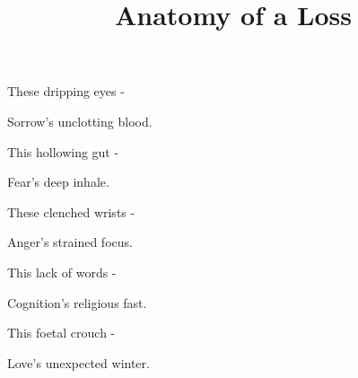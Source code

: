 \documentclass{article}
\title{Anatomy of a Loss}
\begin{document}
 \newline

These dripping eyes - \newline

Sorrow's unclotting blood.\newline

This hollowing gut - \newline

Fear's deep inhale.\newline

These clenched wrists - \newline

Anger's strained focus.\newline

This lack of words - \newline

Cognition's religious fast.\newline

This foetal crouch - \newline

Love's unexpected winter.\newline
\end{document}
